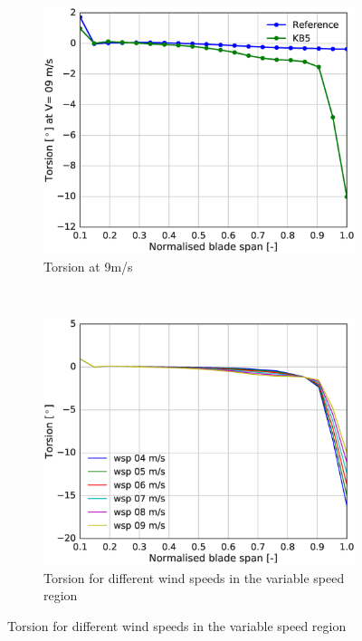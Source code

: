 \begin{figure}[tph]
\begin{subfigure}{0.50\textwidth}
\includegraphics[width=\linewidth]{figures/KB6_final/KB5_torsion_09.eps}
\caption{Torsion at 9m/s}
\label{subfig:KB5_tors_posn}
\end{subfigure}
 ~
\begin{subfigure}{0.50\textwidth}
\includegraphics[width=\linewidth]{figures/KB6_final/KB5_torsion_diffwsp.eps}
\caption{Torsion for different wind speeds in the variable speed region}
\label{subfig:KB5_tors_posn_diffwsp}
\end{subfigure}


\end{figure}
